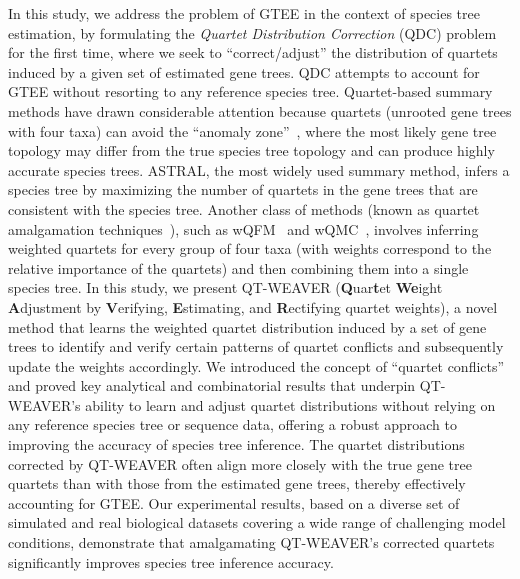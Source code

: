 \documentclass[runningheads]{llncs}
\newcommand{\add}[1]{{\color{blue} #1}}
\begin{document}

In this study, we address the problem of GTEE in the context of species tree estimation, by formulating the \textit{Quartet Distribution Correction} (QDC) problem for the first time, where we seek to ``correct/adjust'' the distribution of quartets induced by a given set of estimated gene trees. QDC attempts to account for GTEE without resorting to any reference species tree.
Quartet-based summary methods have drawn considerable attention because quartets (unrooted gene trees with four taxa) can avoid the ``anomaly zone''~\cite{DR06,DR09,degnan2013anomalous}, where the most likely gene tree topology may differ from the true species tree topology and can produce highly accurate species trees. ASTRAL, the most widely used summary method, infers a species tree by maximizing the number of quartets in the gene trees that are consistent with the species tree. Another class of methods (known as quartet amalgamation techniques~\cite{snir_quartets_2008,qfm,qfm-fi,wqfm,wqmc}), such as wQFM~\cite{wqfm} and wQMC~\cite{wqmc}, involves inferring weighted quartets for every group of four taxa (with weights correspond to the relative importance of the quartets) and then combining them into a single species tree. In this study, we present QT-WEAVER (\textbf{Q}uar\textbf{t}et \textbf{We}ight \textbf{A}djustment by \textbf{V}erifying, \textbf{E}stimating, and \textbf{R}ectifying quartet weights), a novel method that learns the weighted quartet distribution induced by a set of gene trees to identify and verify certain patterns of quartet conflicts and subsequently update the weights accordingly. We introduced the concept of ``quartet conflicts'' and proved key analytical and combinatorial results that underpin QT-WEAVER's ability to learn and adjust quartet distributions without relying on any reference species tree or sequence data, offering a robust approach to improving the accuracy of species tree inference. The quartet distributions corrected by QT-WEAVER often align more closely with the true gene tree quartets than with those from the estimated gene trees, thereby effectively accounting for GTEE. Our experimental results, based on a diverse set of simulated and real biological datasets covering a wide range of challenging model conditions, demonstrate that amalgamating QT-WEAVER's corrected quartets significantly improves species tree inference accuracy. 
\end{document}
